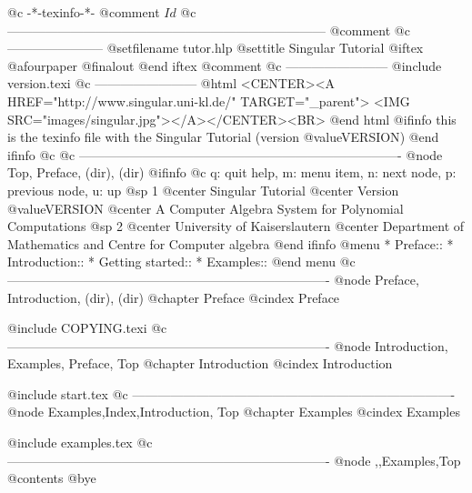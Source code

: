     @c -*-texinfo-*-
@comment $Id$
@c ---------------------------------------------------------------------------
@comment %
@c -----------------------
@setfilename tutor.hlp
@settitle Singular Tutorial
@iftex
@afourpaper
@finalout
@end iftex
@comment %
@c ------------------------
@include version.texi
@c ------------------------
@html
<CENTER><A HREF="http://www.singular.uni-kl.de/" TARGET="_parent">
<IMG SRC="images/singular.jpg"></A></CENTER><BR>
@end html
@ifinfo
this is the texinfo file with the Singular Tutorial (version @value{VERSION})
@end ifinfo
@c
@c ----------------------------------------------------------------------------
@node    Top, Preface,    (dir),    (dir)
@ifinfo
@c q: quit help, m: menu item, n: next node, p: previous node, u: up
@sp 1
@center Singular Tutorial
@center Version @value{VERSION}
@center A Computer Algebra System for Polynomial Computations
@sp 2
@center University of Kaiserslautern
@center Department of Mathematics and Centre for Computer algebra
@end ifinfo
@menu
* Preface::
* Introduction::
* Getting started::
* Examples::
@end menu
@c ----------------------------------------------------------------------------
@node Preface, Introduction, (dir),  (dir)
@chapter Preface
@cindex Preface

@include COPYING.texi
@c ----------------------------------------------------------------------------
@node Introduction, Examples, Preface, Top
@chapter Introduction
@cindex Introduction

@include start.tex
@c ----------------------------------------------------------------------------
@node Examples,Index,Introduction, Top
@chapter Examples
@cindex Examples

@include examples.tex
@c ----------------------------------------------------------------------------
@node ,,Examples,Top
@contents
@bye
